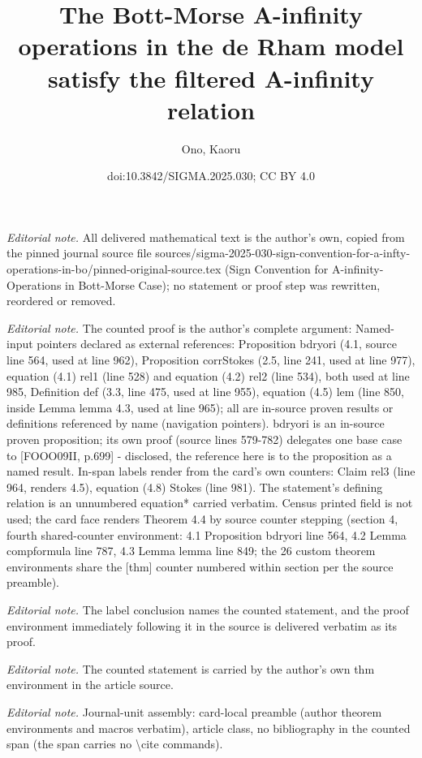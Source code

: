 \documentclass[10pt,a4paper]{article}
\title{The Bott-Morse A-infinity operations in the de Rham model satisfy the filtered A-infinity relation}
\author{Ono, Kaoru}
\date{doi:10.3842/SIGMA.2025.030; CC BY 4.0}
\numberwithin{equation}{section}
\theoremstyle{definition}
\begin{document}
\maketitle
\setcounter{section}{4}
\setcounter{thm}{3}
\setcounter{equation}{7}
\noindent\textit{Editorial note.} All delivered mathematical text is the author's own, copied from the pinned journal source file sources/sigma-2025-030-sign-convention-for-a-infty-operations-in-bo/pinned-original-source.tex (Sign Convention for A-infinity-Operations in Bott-Morse Case); no statement or proof step was rewritten, reordered or removed.\par\medskip
\noindent\textit{Editorial note.} The counted proof is the author's complete argument: Named-input pointers declared as external references: Proposition bdryori (4.1, source line 564, used at line 962), Proposition corrStokes (2.5, line 241, used at line 977), equation (4.1) rel1 (line 528) and equation (4.2) rel2 (line 534), both used at line 985, Definition def (3.3, line 475, used at line 955), equation (4.5) lem (line 850, inside Lemma lemma 4.3, used at line 965); all are in-source proven results or definitions referenced by name (navigation pointers). bdryori is an in-source proven proposition; its own proof (source lines 579-782) delegates one base case to [FOOO09II, p.699] - disclosed, the reference here is to the proposition as a named result. In-span labels render from the card's own counters: Claim rel3 (line 964, renders 4.5), equation (4.8) Stokes (line 981). The statement's defining relation is an unnumbered equation* carried verbatim. Census printed field is not used; the card face renders Theorem 4.4 by source counter stepping (section 4, fourth shared-counter environment: 4.1 Proposition bdryori line 564, 4.2 Lemma compformula line 787, 4.3 Lemma lemma line 849; the 26 custom theorem environments share the [thm] counter numbered within section per the source preamble).\par\medskip
\noindent\textit{Editorial note.} The label conclusion names the counted statement, and the proof environment immediately following it in the source is delivered verbatim as its proof.\par\medskip
\noindent\textit{Editorial note.} The counted statement is carried by the author's own thm environment in the article source.\par\medskip
\noindent\textit{Editorial note.} Journal-unit assembly: card-local preamble (author theorem environments and macros verbatim), article class, no bibliography in the counted span (the span carries no \textbackslash{}cite commands).\par\medskip
\end{document}
